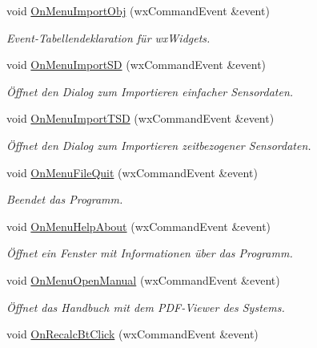 \begin{DoxyCompactItemize}
\item 
void \hyperlink{classGUIMainWindow_a9fd9f2be8f45cb5433193f5d28c924bc}{On\-Menu\-Import\-Obj} (wx\-Command\-Event \&event)
\begin{DoxyCompactList}\small\item\em Event-\/\-Tabellendeklaration für wx\-Widgets. \end{DoxyCompactList}\item 
void \hyperlink{classGUIMainWindow_a405b99746fe6f35ec527c57604e53ce2}{On\-Menu\-Import\-S\-D} (wx\-Command\-Event \&event)
\begin{DoxyCompactList}\small\item\em Öffnet den Dialog zum Importieren einfacher Sensordaten. \end{DoxyCompactList}\item 
void \hyperlink{classGUIMainWindow_ab6b1fb242c4b529764093a092349f560}{On\-Menu\-Import\-T\-S\-D} (wx\-Command\-Event \&event)
\begin{DoxyCompactList}\small\item\em Öffnet den Dialog zum Importieren zeitbezogener Sensordaten. \end{DoxyCompactList}\item 
void \hyperlink{classGUIMainWindow_a594fc9fea2ef8cc4febc3c48c0e260c4}{On\-Menu\-File\-Quit} (wx\-Command\-Event \&event)
\begin{DoxyCompactList}\small\item\em Beendet das Programm. \end{DoxyCompactList}\item 
void \hyperlink{classGUIMainWindow_acefa13614ee8e5fc228fc577b7471b26}{On\-Menu\-Help\-About} (wx\-Command\-Event \&event)
\begin{DoxyCompactList}\small\item\em Öffnet ein Fenster mit Informationen über das Programm. \end{DoxyCompactList}\item 
void \hyperlink{classGUIMainWindow_ac3fd30af35182d72c407f04a81abea07}{On\-Menu\-Open\-Manual} (wx\-Command\-Event \&event)
\begin{DoxyCompactList}\small\item\em Öffnet das Handbuch mit dem P\-D\-F-\/\-Viewer des Systems. \end{DoxyCompactList}\item 
void \hyperlink{classGUIMainWindow_a0c2de30274c7f52ff74ec1217e47a9e5}{On\-Recalc\-Bt\-Click} (wx\-Command\-Event \&event)

\end{DoxyCompactItemize}
